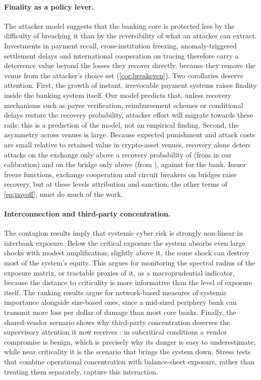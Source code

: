 \paragraph{Finality as a policy lever.} The attacker model suggests that the banking core is protected less by the difficulty of breaching it than by the reversibility of what an attacker can extract. Investments in payment recall, cross-institution freezing, anomaly-triggered settlement delays and international cooperation on tracing therefore carry a deterrence value beyond the losses they recover directly, because they remove the venue from the attacker's choice set (\cref{cor:breakeven}). Two corollaries deserve attention. First, the growth of instant, irrevocable payment systems raises finality inside the banking system itself. Our model predicts that, unless recovery mechanisms such as payee verification, reimbursement schemes or conditional delays restore the recovery probability, attacker effort will migrate towards these rails; this is a prediction of the model, not an empirical finding. Second, the asymmetry across venues is large. Because expected punishment and attack costs are small relative to retained value in crypto-asset venues, recovery alone deters attacks on the exchange only above a recovery probability of \breakEvenExchange{} (from \exchangeKappa{} in our calibration) and on the bridge only above \breakEvenBridge{} (from \bridgeKappa{}), against \breakEven{} for the bank. Issuer freeze functions, exchange cooperation and circuit breakers on bridges raise recovery, but at these levels attribution and sanction, the other terms of \cref{eq:payoff}, must do much of the work.

\paragraph{Interconnection and third-party concentration.} The contagion results imply that systemic cyber risk is strongly non-linear in interbank exposure. Below the critical exposure the system absorbs even large shocks with modest amplification; slightly above it, the same shock can destroy most of the system's equity. This argues for monitoring the spectral radius of the exposure matrix, or tractable proxies of it, as a macroprudential indicator, because the distance to criticality is more informative than the level of exposure itself. The ranking results argue for network-based measures of systemic importance alongside size-based ones, since a mid-sized periphery bank can transmit more loss per dollar of damage than most core banks. Finally, the shared-vendor scenario shows why third-party concentration deserves the supervisory attention it now receives \citep{dora2022}: in subcritical conditions a vendor compromise is benign, which is precisely why its danger is easy to underestimate, while near criticality it is the scenario that brings the system down. Stress tests that combine operational concentration with balance-sheet exposure, rather than treating them separately, capture this interaction.

